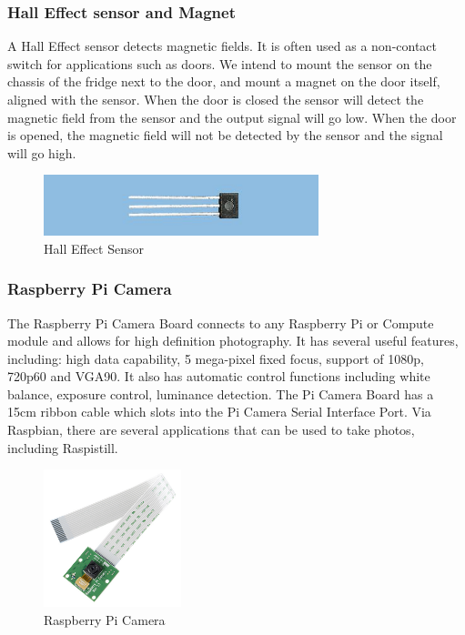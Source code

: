 \documentclass[10pt]{article}
\begin{document}
\subsubsection{Hall Effect sensor and Magnet}

A Hall Effect sensor detects magnetic fields. It is often used as a non-contact switch for applications such as doors. We intend to mount the sensor on the chassis of the fridge next to the door, and mount a magnet on the door itself, aligned with the sensor. When the door is closed the sensor will detect the magnetic field from the sensor and the output signal will go low. When the door is opened, the magnetic field will not be detected by the sensor and the signal will go high.

\begin{figure}[h]
\centering
\caption{Hall Effect Sensor}
\label{Hall Effect Sensor}
\includegraphics[width=8cm]{images/hall-effect-sensor.jpg}
\end{figure}


\subsubsection{Raspberry Pi Camera}

The Raspberry Pi Camera Board connects to any Raspberry Pi or Compute module and allows for high definition photography. It has several useful features, including: high data capability, 5 mega-pixel fixed focus, support of 1080p, 720p60 and VGA90. It also has automatic control functions including white balance, exposure control, luminance detection.
The Pi Camera Board has a 15cm ribbon cable which slots into the Pi Camera Serial Interface Port. Via Raspbian, there are several applications that can be used to take photos, including Raspistill.

\begin{figure}[h]
\centering
\caption{Raspberry Pi Camera}
\label{Raspberry Pi Camera}
\includegraphics[height=4cm]{images/pi-camera.jpg}
\end{figure}
\end{document}
